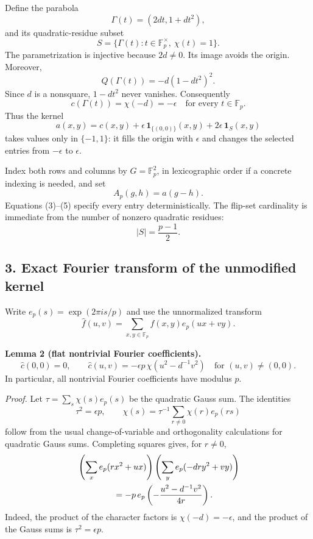 \documentclass[
  11pt,
]{article}
\begin{document}
Define the parabola \[
\Gamma(t)=(2dt,1+dt^2),
\] and its quadratic-residue subset \[
S=\{\Gamma(t):t\in\mathbb F_p^\times,\ \chi(t)=1\}. \tag{3}
\] The parametrization is injective because \(2d\ne0\). Its image avoids
the origin. Moreover, \[
Q(\Gamma(t))=-d(1-dt^2)^2.
\] Since \(d\) is a nonsquare, \(1-dt^2\) never vanishes. Consequently
\[
c(\Gamma(t))=\chi(-d)=-\epsilon
\quad\text{for every }t\in\mathbb F_p.
\] Thus the kernel \[
a(x,y)=c(x,y)+\epsilon\,\mathbf1_{\{(0,0)\}}(x,y)
       +2\epsilon\,\mathbf1_S(x,y) \tag{4}
\] takes values only in \(\{-1,1\}\): it fills the origin with
\(\epsilon\) and changes the selected entries from \(-\epsilon\) to
\(\epsilon\).

Index both rows and columns by \(G=\mathbb F_p^2\), in lexicographic
order if a concrete indexing is needed, and set \[
A_p(g,h)=a(g-h). \tag{5}
\] Equations (3)--(5) specify every entry deterministically. The
flip-set cardinality is immediate from the number of nonzero quadratic
residues: \[
|S|=\frac{p-1}{2}. \tag{6}
\]

\subsection{3. Exact Fourier transform of the unmodified
kernel}\label{exact-fourier-transform-of-the-unmodified-kernel}

Write \(e_p(s)=\exp(2\pi i s/p)\) and use the unnormalized transform \[
\widehat f(u,v)=\sum_{x,y\in\mathbb F_p}f(x,y)e_p(ux+vy).
\]

\textbf{Lemma 2 (flat nontrivial Fourier coefficients).} \[
\widehat c(0,0)=0,
\qquad
\widehat c(u,v)=-\epsilon p\,\chi(u^2-d^{-1}v^2)
\quad\text{for }(u,v)\ne(0,0). \tag{7}
\] In particular, all nontrivial Fourier coefficients have modulus
\(p\).

\emph{Proof.} Let \(\tau=\sum_s\chi(s)e_p(s)\) be the quadratic Gauss
sum. The identities \[
\tau^2=\epsilon p,\qquad
\chi(s)=\tau^{-1}\sum_{r\ne0}\chi(r)e_p(rs)
\] follow from the usual change-of-variable and orthogonality
calculations for quadratic Gauss sums. Completing squares gives, for
\(r\ne0\), \[
\begin{aligned}
&\left(\sum_x e_p(rx^2+ux)\right)
\left(\sum_y e_p(-dry^2+vy)\right)\\
&\hspace{15mm}=-p\,e_p\left(-\frac{u^2-d^{-1}v^2}{4r}\right).
\end{aligned}
\] Indeed, the product of the character factors is
\(\chi(-d)=-\epsilon\), and the product of the Gauss sums is
\(\tau^2=\epsilon p\).
\end{document}
